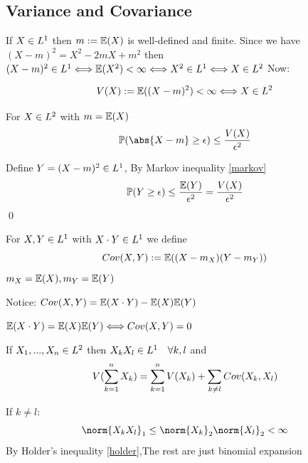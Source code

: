 \subsection*{Variance and Covariance}
If $X\in L^{1}$ then $m := \mathbb{E}(X)$ is well-defined and finite. Since we have $(X-m)^2 = X^2 - 2mX + m^2$ then $(X-m)^2\in L^{1}\Longleftrightarrow \mathbb{E}(X^2) < \infty \Longleftrightarrow X^2\in L^{1} \Longleftrightarrow X\in L^{2}$ Now:
\begin{dfn}[Variance of $X$]
\begin{equation*}
    V(X) := \mathbb{E}((X-m)^2) < \infty \Longleftrightarrow X\in L^{2}
\end{equation*}
\end{dfn}
\begin{thm}For $X\in L^{2}$ with $m = \mathbb{E}(X)$
\begin{equation*}
    \prob(\abs{X-m}\geq \epsilon) \leq \frac{V(X)}{\epsilon^2}
\end{equation*}
\end{thm}
\pf Define $Y = (X-m)^2 \in L^{1}$, By Markov inequality \ref{markov}
\begin{equation*}
\mathbb{P}(Y\geq \epsilon) \leq \frac{\mathbb{E}(Y)}{\epsilon^2} =  \frac{V(X)}{\epsilon^2}   
\end{equation*}\qed
\begin{dfn}
For $X,Y\in L^{1}$ with $X\cdot Y\in L^{1}$ we define 
\begin{equation*}
    Cov(X,Y) := \mathbb{E}((X-m_X)(Y-m_Y))
\end{equation*}$m_X = \mathbb{E}(X) , m_Y = \mathbb{E}(Y)$
\end{dfn}Notice: $Cov(X,Y) = \mathbb{E}(X\cdot Y) - \mathbb{E}(X)\mathbb{E}(Y)$
\begin{dfn}
$\mathbb{E}(X\cdot Y) = \mathbb{E}(X)\mathbb{E}(Y) \Longleftrightarrow Cov(X,Y) = 0$
\end{dfn}
\begin{lem}
If $X_1,...,X_n \in L^{2}$ then $X_k X_l \in L^{1} \quad\forall k,l$ and \begin{equation*}
    V(\sum\limits_{k=1}^n X_k) = \sum\limits_{k=1}^n V(X_k) + \sum\limits_{k\neq l}Cov(X_k,X_l)
\end{equation*}
\end{lem}
\pf If $k \neq l:$
\begin{equation*}
    \norm{X_k X_l}_1 \leq \norm{X_k}_2\norm{X_l}_2 < \infty
\end{equation*}By Holder's inequality \ref{holder},The rest are just binomial expansion \\

